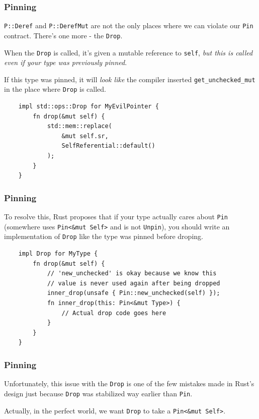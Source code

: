 \documentclass[aspectratio=1610,t]{beamer}
\begin{document}

\begin{frame}[fragile]
\frametitle{Pinning}
\texttt{P::Deref} and \texttt{P::DerefMut} are not the only places where we can violate our \texttt{Pin} contract. There's one more - the \texttt{Drop}.

When the \texttt{Drop} is called, it's given a mutable reference to \texttt{self}, \textit{but this is called even if your type was previously pinned}.

If this type was pinned, it will \textit{look like} the compiler inserted \texttt{get\_unchecked\_mut} in the place where \texttt{Drop} is called.

\begin{verbatim}
    impl std::ops::Drop for MyEvilPointer {
        fn drop(&mut self) {
            std::mem::replace(
                &mut self.sr,
                SelfReferential::default()
            );
        }
    }
\end{verbatim}
\end{frame}


\begin{frame}[fragile]
\frametitle{Pinning}
To resolve this, Rust proposes that if your type actually cares about \texttt{Pin} (somewhere uses \texttt{Pin<\&mut Self>} and is not \texttt{Unpin}), you should write an implementation of \texttt{Drop} like the type was pinned before droping.

\begin{verbatim}
    impl Drop for MyType {
        fn drop(&mut self) {
            // 'new_unchecked' is okay because we know this
            // value is never used again after being dropped
            inner_drop(unsafe { Pin::new_unchecked(self) });
            fn inner_drop(this: Pin<&mut Type>) {
                // Actual drop code goes here
            }
        }
    }
\end{verbatim}
\end{frame}


\begin{frame}[fragile]
\frametitle{Pinning}
Unfortunately, this issue with the \texttt{Drop} is one of the few mistakes made in Rust's design just because \texttt{Drop} was stabilized way earlier than \texttt{Pin}.

Actually, in the perfect world, we want \texttt{Drop} to take a \texttt{Pin<\&mut Self>}.
\end{frame}
\end{document}
